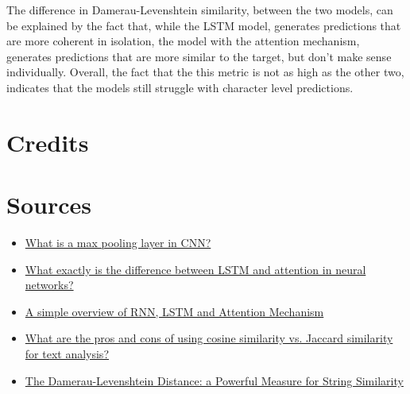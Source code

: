 \documentclass{article}
\begin{document}
The difference in Damerau-Levenshtein similarity, between the two models, can be explained by the fact that,
while the LSTM model, generates predictions that are more coherent in isolation, the model with the attention mechanism,
generates predictions that are more similar to the target, but don't make sense individually. Overall, the fact that the
this metric is not as high as the other two, indicates that the models still struggle with character level predictions.

\section{Credits}

\section{Sources}
\begin{itemize}
    \item \href{https://www.educative.io/answers/what-is-a-max-pooling-layer-in-cnn}{What is a max pooling layer in CNN?}
    \item \href{https://www.quora.com/What-exactly-is-the-difference-between-LSTM-and-attention-in-neural-networks#:~:text=In%20summary%2C%20while%20LSTM%20is,performance%20of%20neural%20network%20models.}{What exactly is the difference between LSTM and attention in neural networks?}
    \item \href{https://medium.com/swlh/a-simple-overview-of-rnn-lstm-and-attention-mechanism-9e844763d07b}{A simple overview of RNN, LSTM and Attention Mechanism}
    \item \href{https://www.linkedin.com/advice/3/what-pros-cons-using-cosine-similarity-vs}{What are the pros and cons of using cosine similarity vs. Jaccard similarity for text analysis?}
    \item \href{https://medium.com/@evertongomede/the-damerau-levenshtein-distance-a-powerful-measure-for-string-similarity-22dc4b150f0a}{The Damerau-Levenshtein Distance: a Powerful Measure for String Similarity}
\end{itemize}
\end{document}
